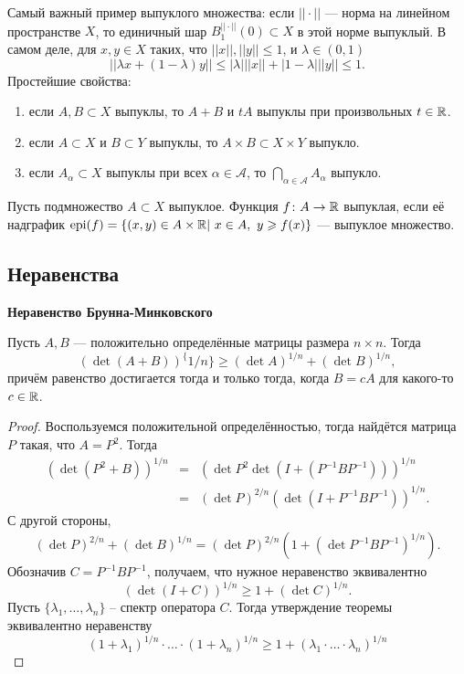 Самый важный пример выпуклого множества: если $||\cdot||$ --- норма на линейном пространстве $X$, то единичный шар $B^{||\cdot||}_1(0)\subset X$ в этой норме выпуклый. В самом деле, для $x,y\in X$ таких, что $||x||,||y||\leqslant 1$, и $\lambda\in(0,1)$
		\begin{equation*}
			||\lambda x+(1-\lambda)y||\leqslant |\lambda|||x||+|1-\lambda|||y||\leqslant 1.
		\end{equation*}
Простейшие свойства:
\begin{enumerate}
	\item если $A,B\subset X$ выпуклы, то $A+B$ и $tA$ выпуклы при произвольных $t\in\mathbb {R}$.
	\item если $A\subset X$ и $B\subset Y$ выпуклы, то $A\times B\subset X\times Y$ выпукло.
	\item если $A_{\alpha}\subset X$ выпуклы при всех $\alpha\in\mathcal{A}$, то $\bigcap_{\alpha\in\mathcal{A}} A_{\alpha}$ выпукло.
\end{enumerate}
\begin{defin}
	Пусть подмножество $A\subset X$ выпуклое. Функция $f\colon A\to\mathbb {R}$ выпуклая, если её надграфик $\epi(f)=\{(x,y)\in A\times\RR| \ x\in A,\ y\geqslant f(x)\}$ --- выпуклое множество.
\end{defin}

\subsection{Неравенства}
\textbf{Неравенство Брунна-Минковского}
\begin{theorem}
Пусть $A,B$ --- положительно определённые матрицы размера $n\times n$. Тогда
	\begin{equation}
		(\det(A+B))^\{1/n\}\geqslant(\det A)^{1/n}+(\det B)^{1/n},
	\end{equation}
причём равенство достигается тогда и только тогда, когда $B=cA$ для какого-то $c\in\mathbb {R}$.
\end{theorem}
\begin{proof}
	Воспользуемся положительной определённостью, тогда найдётся матрица $P$ такая, что $A=P^2$. Тогда
	\begin{eqnarray*}
		(\det(P^2+B))^{1/n}&=&(\det P^2\det(I+(P^{-1}BP^{-1})))^{1/n}\\
						   &=&(\det P)^{2/n}(\det(I+P^{-1}BP^{-1}))^{1/n}.
	\end{eqnarray*}
	С другой стороны,
	\begin{eqnarray*}
		(\det P)^{2/n}+(\det B)^{1/n}=(\det P)^{2/n}(1+(\det P^{-1}BP^{-1})^{1/n}).
	\end{eqnarray*}
	Обозначив $C=P^{-1}BP^{-1}$, получаем, что нужное неравенство эквивалентно
	\begin{equation}\label{eq:1}
		(\det(I+C))^{1/n}\geqslant 1+(\det C)^{1/n}.
	\end{equation}
	Пусть $\{\lambda_1,\ldots,\lambda_n\}$ -- спектр оператора $C$. Тогда утверждение теоремы эквивалентно неравенству
	\begin{equation}
		(1+\lambda_1)^{1/n}\cdot\ldots\cdot(1+\lambda_n)^{1/n}\geqslant 1+(\lambda_1\cdot\ldots\cdot\lambda_n)^{1/n}
	\end{equation}
\end{proof}

